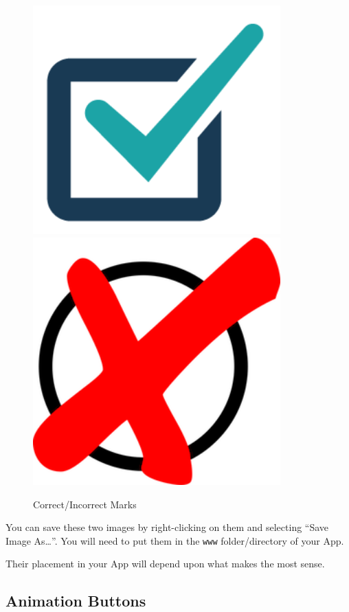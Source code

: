 \documentclass[
]{book}
\begin{document}
\begin{figure}

{\centering \includegraphics[width=3.75in]{images/check} \includegraphics[width=3.75in]{images/cross} 

}

\caption{Correct/Incorrect Marks}\label{fig:marks}
\end{figure}

You can save these two images by right-clicking on them and selecting ``Save Image As\ldots{}''. You will need to put them in the \texttt{www} folder/directory of your App.

Their placement in your App will depend upon what makes the most sense.

\hypertarget{animation-buttons}{%
\subsection{Animation Buttons}\label{animation-buttons}}
\end{document}
